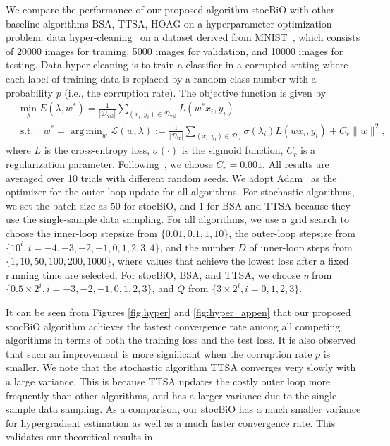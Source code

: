 \documentclass{osudissert96}
\def\gD{{\mathcal{D}}}
\def\gL{{\mathcal{L}}}
\DeclareMathOperator*{\argmin}{arg\,min}
\begin{document}
\vspace{0.1cm}
We compare the performance of our proposed algorithm stocBiO with other baseline algorithms BSA, TTSA, HOAG on a hyperparameter optimization problem: data hyper-cleaning~\cite{shaban2019truncated} on a dataset derived from MNIST~\cite{lecun1998gradient}, which consists of 20000 images for training, 5000 images for validation, and 10000 images for testing.  
Data hyper-cleaning is to train a classifier in a corrupted setting where each label of training data is replaced by a random class number with a probability $p$ (i.e., the corruption rate). The objective function is given by 
\begin{align*}
&\min_\lambda E(\lambda,w^*) = \frac{1}{|\gD_{\text{val}}|}\sum_{(x_i,y_i)\in \gD_{\text{val}}} L(w^*x_i, y_i) \nonumber
\\& \;\mbox{s.t.} \quad w^* = \argmin_{w} \gL(w,\lambda):= \frac{1}{|\gD_{\text{tr}}|}\sum_{(x_i,y_i)\in \gD_{\text{tr}}}\sigma(\lambda_i)L(wx_i, y_i)  + C_r \|w\|^2,
\end{align*}
where $L$ is the cross-entropy loss, $\sigma(\cdot)$ is the sigmoid function, $C_r$ is a regularization parameter. Following~\cite{shaban2019truncated}, we choose $C_r=0.001$. 
 All results are averaged over 10 trials with
different random seeds. We adopt Adam~\cite{kingma2014adam} as the optimizer for the outer-loop update for all algorithms. For stochastic algorithms, we set the batch size as $50$ for stocBiO, and $1$ for BSA and TTSA because they use the single-sample data sampling. For all algorithms, we use a grid search to choose the inner-loop stepsize from $\{0.01,0.1,1,10\}$, the  outer-loop stepsize from $\{10^{i},i=-4,-3,-2,-1,0,1,2,3,4\}$, and the number $D$ of inner-loop steps from $\{1,10,50,100,200,1000\}$, where values that achieve the lowest loss after a fixed running time are selected. For  stocBiO, BSA, and TTSA, we choose $\eta$ from $\{0.5\times 2^i, i=-3,-2,-1,0,1,2,3\}$, and $Q$ from $\{3\times 2^i, i=0,1,2,3\}$. 

It can be seen from Figures \ref{fig:hyper} and \ref{fig:hyper_appen} that our proposed stocBiO algorithm achieves the fastest convergence rate among all competing algorithms in terms of both the training loss and the test loss. It is also observed that such an improvement is more significant when the corruption rate $p$ is smaller.  We note that the stochastic algorithm TTSA converges very slowly with a large variance. This is because TTSA  updates the costly outer loop more frequently than other algorithms,  and has a larger variance due to the single-sample data sampling. As a comparison, our stocBiO has a much smaller variance for hypergradient estimation as well as a much faster convergence rate.  This validates our theoretical results in~. 
\end{document}

